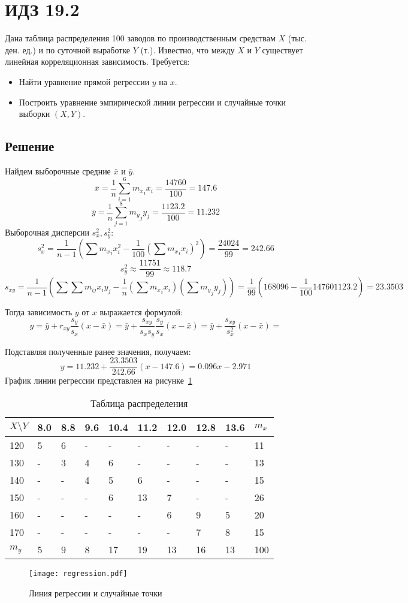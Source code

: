 \documentclass{article}
\theoremstyle{problemstyle}
\begin{document}
\section{ИДЗ 19.2}
Дана таблица распределения 100 заводов по производственным средствам
$X$ (тыс. ден. ед.) и по суточной выработке $Y$ (т.). 
Известно, что между $X$ и $Y$ существует линейная корреляционная зависимость. 
Требуется:
\begin{itemize}
  \item Найти уравнение прямой регрессии $y$ на $x$.
  \item Построить уравнение эмпирической линии регрессии и случайные точки выборки
    $(X, Y)$.
\end{itemize}

\subsection{Решение}
Найдем выборочные средние $\bar x$ и $\bar y$.
\[
  \bar x =
  \frac{1}{n} \sum_{i=1}^6 {m_x}_i x_i =
  \frac{14760}{100} =
  147.6
\]
\[
  \bar y = 
  \frac{1}{n} \sum_{j=1}^8 {m_y}_j y_j =
  \frac{1123.2}{100} = 11.232
\]
Выборочная дисперсии $s_x^2, s_y^2$:
\[
  s_x^2 = 
  \frac{1}{n-1} \left(\sum {m_x}_i x_i^2 - \frac{1}{100} \left(\sum {m_x}_i{x_i}\right)^2\right) =
  \frac{24024}{99} =
  242.66
\]
\[
  s_y^2 \approx \frac{11751}{99} \approx 118.7
\]
\[
  s_{xy} =
  \frac{1}{n-1} \left( \sum \sum m_{ij} x_i y_j - \frac{1}{n} \left(\sum {m_x}_i x_i \right)\left(\sum {m_y}_j y_j \right) \right) =
  \frac{1}{99} ( 168096 - \frac{1}{100} 14760 1123.2) =
  23.3503
\]

Тогда зависимость $y$ от $x$ выражается формулой:
\[
  y = 
  \bar y + r_{xy} \frac{s_y}{s_x} (x - \bar x) =
  \bar y + \frac{s_{xy}}{s_x s_y} \frac{s_y}{s_x} (x - \bar x) = 
  \bar y + \frac{s_{xy}}{s_x^2} (x - \bar x) =
\]

Подставляя полученные ранее значения, получаем:
\[
  y = 11.232 + \frac{23.3503}{242.66} (x - 147.6) =
      0.096 x - 2.971
\]
График линии регрессии представлен на рисунке~\ref{fig:regression}

\begin{table}[ht]
  \centering
  \begin{tabular}{|l|l|l|l|l|l|l|l|l|l|}
    \hline
    $X \setminus Y$ & 8.0 & 8.8 & 9.6 & 10.4 & 11.2 & 12.0 & 12.8 & 13.6 & $m_x$ \\ 
    \hline
    120             & 5 & 6 & - & - & - & - & - & - & 11 \\ 
    130 & - & 3 & 4 & 6 & - & - & - & - & 13 \\ 
    140 & - & - & 4 & 5 & 6 & - & - & - & 15 \\
    150 & - & - & - & 6 & 13 & 7 & - & - & 26 \\
    160 & - & - & - & - & - & 6 & 9 & 5 & 20 \\ 
    170 & - & - & - & - & - & - & 7 & 8 & 15 \\
    \hline
    $m_y$ & 5 & 9 & 8 & 17 & 19 & 13 & 16 & 13 & 100 \\
    \hline
    
  \end{tabular}
  \caption{Таблица распределения}\label{tab:2_data}
\end{table}

\begin{figure}
  \texttt{[image: regression.pdf]}
  \caption{Линия регрессии и случайные точки}\label{fig:regression}
\end{figure}
\end{document}
